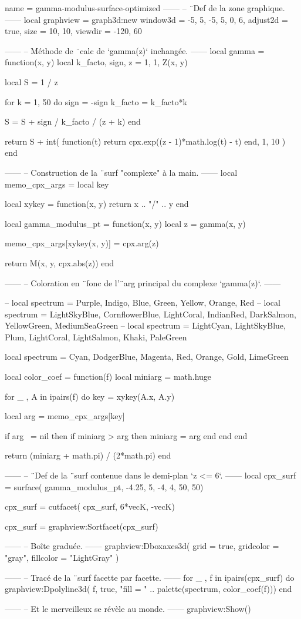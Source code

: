 \documentclass[10pt]{standalone}
\begin{document}
\begin{luadraw}{name = gamma-modulus-surface-optimized}
------
-- ¨Def de la zone graphique.
------
local graphview = graph3d:new{
  window3d = {-5, 5, -5, 5, 0, 6},
  adjust2d = true,
  size     = {10, 10},
  viewdir  = {-120, 60}
}

------
-- Méthode de ¨calc de `gamma(z)` inchangée.
------
local gamma = function(x, y)
  local k_facto, sign, z = 1, 1, Z(x, y)

  local S = 1 / z

  for k = 1, 50 do
    sign    = -sign
    k_facto = k_facto*k

    S = S + sign / k_facto / (z + k)
  end

  return S + int(
    function(t)
      return cpx.exp((z - 1)*math.log(t) - t)
    end,
    1, 10
  )
end

------
-- Construction de la ¨surf "complexe" à la main.
------
local memo_cpx_args = {}
local key

local xykey = function(x, y)
    return x .. "/" .. y
end

local gamma_modulus_pt = function(x, y)
  local z = gamma(x, y)

  memo_cpx_args[xykey(x, y)] = cpx.arg(z)

  return M(x, y, cpx.abs(z))
end

------
-- Coloration en ¨fonc de l'¨arg principal du complexe `gamma(z)`.
------

-- local spectrum = {Purple, Indigo, Blue, Green, Yellow, Orange, Red}
-- local spectrum = {LightSkyBlue, CornflowerBlue, LightCoral, IndianRed, DarkSalmon, YellowGreen, MediumSeaGreen}
-- local spectrum = {LightCyan, LightSkyBlue, Plum, LightCoral, LightSalmon, Khaki, PaleGreen}

local spectrum = {Cyan, DodgerBlue, Magenta, Red, Orange, Gold, LimeGreen}

local color_coef = function(f)
  local miniarg = math.huge

  for _ , A in ipairs(f) do
    key = xykey(A.x, A.y)

    local arg = memo_cpx_args[key]

    if arg ~= nil then
      if miniarg > arg then
        miniarg = arg
      end
    end
  end

  return (miniarg + math.pi) / (2*math.pi)
end

------
-- ¨Def de la ¨surf contenue dans le demi-plan `z <= 6`.
------
local cpx_surf = surface(
  gamma_modulus_pt,
  -4.25, 5, -4, 4,
  {50, 50})

cpx_surf = cutfacet(
  cpx_surf,
  {6*vecK, -vecK})

cpx_surf = graphview:Sortfacet(cpx_surf)

------
-- Boîte graduée.
------
graphview:Dboxaxes3d({
  grid      = true,
  gridcolor = "gray",
  fillcolor = "LightGray"
})

------
-- Tracé de la ¨surf facette par facette.
------
for _ , f in ipairs(cpx_surf) do
  graphview:Dpolyline3d(
    f,
    true,
       "fill = "
    .. palette(spectrum, color_coef(f)))
end

------
-- Et le merveilleux se révèle au monde.
------
graphview:Show()
\end{luadraw}
\end{document}
